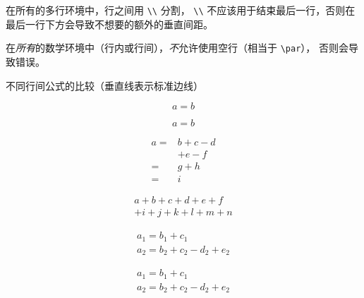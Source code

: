 在所有的多行环境中，行之间用 \verb|\\| 分割，   \verb|\\| 不应该用于结束最后一行，否则在最后一行下方会导致不想要的额外的垂直间距。

在\emph{所有}的数学环境中（行内或行间），\emph{不}允许使用空行（相当于 \verb|\par|），
否则会导致错误。

不同行间公式的比较（垂直线表示标准边线）

\begin{listing}
\begin{equation*}
a=b
\end{equation*}
\end{listing}

\begin{listing}
\begin{equation}
a=b
\end{equation}
\end{listing}

\begin{listing}
\begin{equation}\label{xx}
\begin{split}
a={}&b+c-d\\
&+e-f\\
={}&g+h\\
={}&i
\end{split}
\end{equation}
\end{listing}





\begin{listing}
\begin{multline}
a+b+c+d+e+f\\
+i+j+k+l+m+n
\end{multline}
\end{listing}

\begin{listing}
\begin{gather}
a_1=b_1+c_1\\
a_2=b_2+c_2-d_2+e_2
\end{gather}

\end{listing}



\begin{listing}
\begin{align}
a_1=b_1+c_1\\
a_2=b_2+c_2-d_2+e_2
\end{align}
\end{listing}



